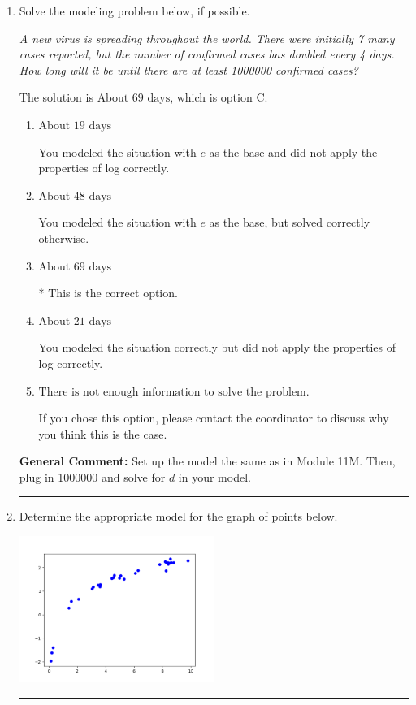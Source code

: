 \documentclass{extbook}[14pt]
\newcommand{\litem}[1]{\item #1

\rule{\textwidth}{0.4pt}}
\begin{document}
\begin{enumerate}\litem{
Solve the modeling problem below, if possible.

\begin{center}
    \textit{ A new virus is spreading throughout the world. There were initially 7 many cases reported, but the number of confirmed cases has doubled every 4 days. How long will it be until there are at least 1000000 confirmed cases? }
\end{center}


The solution is \( \text{About } 69 \text{ days} \), which is option C.\begin{enumerate}[label=\Alph*.]
\item \( \text{About } 19 \text{ days} \)

You modeled the situation with $e$ as the base and did not apply the properties of log correctly.
\item \( \text{About } 48 \text{ days} \)

You modeled the situation with $e$ as the base, but solved correctly otherwise.
\item \( \text{About } 69 \text{ days} \)

* This is the correct option.
\item \( \text{About } 21 \text{ days} \)

You modeled the situation correctly but did not apply the properties of log correctly.
\item \( \text{There is not enough information to solve the problem.} \)

If you chose this option, please contact the coordinator to discuss why you think this is the case.
\end{enumerate}

\textbf{General Comment:} Set up the model the same as in Module 11M. Then, plug in 1000000 and solve for $d$ in your model.
}
\litem{
Determine the appropriate model for the graph of points below.

\begin{center}
    \includegraphics[width=0.5\textwidth]{../Figures/identifyModelGraph12CopyB.png}
\end{center}




}
\end{enumerate}
\end{document}
